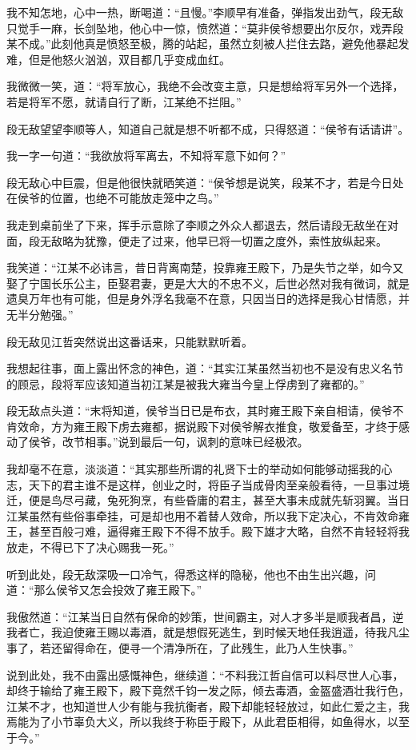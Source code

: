 我不知怎地，心中一热，断喝道：“且慢。”李顺早有准备，弹指发出劲气，段无敌只觉手一麻，长剑坠地，他心中一惊，愤然道：“莫非侯爷想要出尔反尔，戏弄段某不成。”此刻他真是愤怒至极，腾的站起，虽然立刻被人拦住去路，避免他暴起发难，但是他怒火汹汹，双目都几乎变成血红。

我微微一笑，道：“将军放心，我绝不会改变主意，只是想给将军另外一个选择，若是将军不愿，就请自行了断，江某绝不拦阻。”

段无敌望望李顺等人，知道自己就是想不听都不成，只得怒道：“侯爷有话请讲”。

我一字一句道：“我欲放将军离去，不知将军意下如何？”

段无敌心中巨震，但是他很快就晒笑道：“侯爷想是说笑，段某不才，若是今日处在侯爷的位置，也绝不可能放走笼中之鸟。”

我走到桌前坐了下来，挥手示意除了李顺之外众人都退去，然后请段无敌坐在对面，段无敌略为犹豫，便走了过来，他早已将一切置之度外，索性放纵起来。

我笑道：“江某不必讳言，昔日背离南楚，投靠雍王殿下，乃是失节之举，如今又娶了宁国长乐公主，臣娶君妻，更是大大的不忠不义，后世必然对我有微词，就是遗臭万年也有可能，但是身外浮名我毫不在意，只因当日的选择是我心甘情愿，并无半分勉强。”

段无敌见江哲突然说出这番话来，只能默默听着。

我想起往事，面上露出怀念的神色，道：“其实江某虽然当初也不是没有忠义名节的顾忌，段将军应该知道当初江某是被我大雍当今皇上俘虏到了雍都的。”

段无敌点头道：“末将知道，侯爷当日已是布衣，其时雍王殿下亲自相请，侯爷不肯效命，方为雍王殿下虏去雍都，据说殿下对侯爷解衣推食，敬爱备至，才终于感动了侯爷，改节相事。”说到最后一句，讽刺的意味已经极浓。

我却毫不在意，淡淡道：“其实那些所谓的礼贤下士的举动如何能够动摇我的心志，天下的君主谁不是这样，创业之时，将臣子当成骨肉至亲般看待，一旦事过境迁，便是鸟尽弓藏，兔死狗烹，有些昏庸的君主，甚至大事未成就先斩羽翼。当日江某虽然有些俗事牵挂，可是却也用不着替人效命，所以我下定决心，不肯效命雍王，甚至百般刁难，逼得雍王殿下不得不放手。殿下雄才大略，自然不肯轻轻将我放走，不得已下了决心赐我一死。”

听到此处，段无敌深吸一口冷气，得悉这样的隐秘，他也不由生出兴趣，问道：“那么侯爷又怎会投效了雍王殿下。”

我傲然道：“江某当日自然有保命的妙策，世间霸主，对人才多半是顺我者昌，逆我者亡，我迫使雍王赐以毒酒，就是想假死逃生，到时候天地任我逍遥，待我凡尘事了，若还留得命在，便寻一个清净所在，了此残生，此乃人生快事。”

说到此处，我不由露出感慨神色，继续道：“不料我江哲自信可以料尽世人心事，却终于输给了雍王殿下，殿下竟然千钧一发之际，倾去毒酒，金盔盛酒壮我行色，江某不才，也知道世人少有能与我抗衡者，殿下却能轻轻放过，如此仁爱之主，我焉能为了小节辜负大义，所以我终于称臣于殿下，从此君臣相得，如鱼得水，以至于今。”

